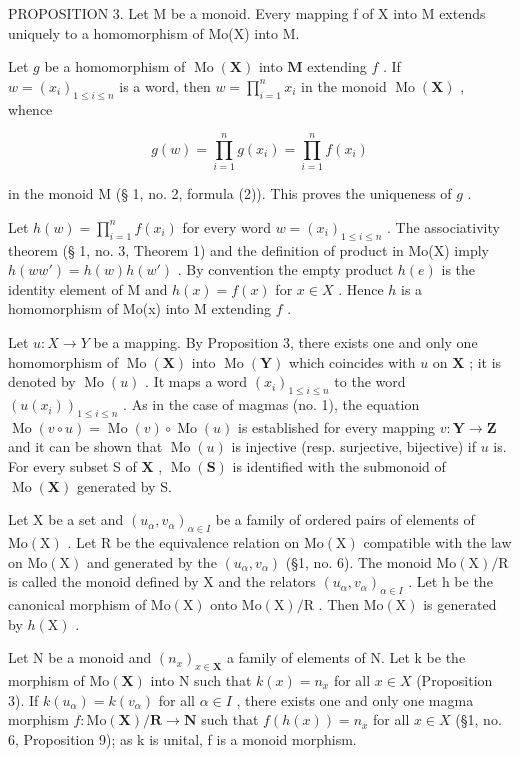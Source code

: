 PROPOSITION 3. Let M be a monoid. Every mapping f of X into M extends uniquely to a homomorphism of Mo(X) into M.

Let \(g\) be a homomorphism of \(\operatorname{Mo}(\mathbf{X})\) into \(\mathbf{M}\) extending \(f\) . If \(w = (x_{i})_{1 \leqslant i \leqslant n}\) is a word, then \(w = \prod_{i=1}^{n} x_{i}\) in the monoid \(\operatorname{Mo}(\mathbf{X})\) , whence

\[
g (w) = \prod_ {i = 1} ^ {n} g (x _ {i}) = \prod_ {i = 1} ^ {n} f (x _ {i})
\]

in the monoid M (§ 1, no. 2, formula (2)). This proves the uniqueness of \(g\) .

Let \(h(w) = \prod_{i=1}^{n} f(x_i)\) for every word \(w = (x_i)_{1 \leqslant i \leqslant n}\) . The associativity theorem (§ 1, no. 3, Theorem 1) and the definition of product in Mo(X) imply \(h(ww') = h(w)h(w')\) . By convention the empty product \(h(e)\) is the identity element of M and \(h(x) = f(x)\) for \(x \in X\) . Hence \(h\) is a homomorphism of Mo(x) into M extending \(f\) .

Let \(u: X \to Y\) be a mapping. By Proposition 3, there exists one and only one homomorphism of \(\operatorname{Mo}(\mathbf{X})\) into \(\operatorname{Mo}(\mathbf{Y})\) which coincides with \(u\) on \(\mathbf{X}\) ; it is denoted by \(\operatorname{Mo}(u)\) . It maps a word \((x_i)_{1 \leqslant i \leqslant n}\) to the word \((u(x_i))_{1 \leqslant i \leqslant n}\) . As in the case of magmas (no. 1), the equation \(\operatorname{Mo}(v \circ u) = \operatorname{Mo}(v) \circ \operatorname{Mo}(u)\) is established for every mapping \(v: \mathbf{Y} \to \mathbf{Z}\) and it can be shown that \(\operatorname{Mo}(u)\) is injective (resp. surjective, bijective) if \(u\) is. For every subset S of \(\mathbf{X}\) , \(\operatorname{Mo}(\mathbf{S})\) is identified with the submonoid of \(\operatorname{Mo}(\mathbf{X})\) generated by S.

Let X be a set and \((u_{\alpha}, v_{\alpha})_{\alpha \in I}\) be a family of ordered pairs of elements of \(\mathrm{Mo}(\mathrm{X})\) . Let R be the equivalence relation on \(\mathrm{Mo}(\mathrm{X})\) compatible with the law on \(\mathrm{Mo}(\mathrm{X})\) and generated by the \((u_{\alpha}, v_{\alpha})\) (§1, no. 6). The monoid \(\mathrm{Mo}(\mathrm{X})/\mathrm{R}\) is called the monoid defined by X and the relators \((u_{\alpha}, v_{\alpha})_{\alpha \in I}\) . Let h be the canonical morphism of \(\mathrm{Mo}(\mathrm{X})\) onto \(\mathrm{Mo}(\mathrm{X})/\mathrm{R}\) . Then \(\mathrm{Mo}(\mathrm{X})\) is generated by \(h(\mathrm{X})\) .

Let N be a monoid and \((n_{x})_{x\in\mathbf{X}}\) a family of elements of N. Let k be the morphism of \(\mathrm{Mo}(\mathbf{X})\) into N such that \(k(x)=n_{x}\) for all \(x\in X\) (Proposition 3). If \(k(u_{\alpha})=k(v_{\alpha})\) for all \(\alpha\in I\) , there exists one and only one magma morphism \(f:\mathrm{Mo}(\mathbf{X})/\mathbf{R}\to\mathbf{N}\) such that \(f(h(x))=n_{x}\) for all \(x\in X\) (§1, no. 6, Proposition 9); as k is unital, f is a monoid morphism.
\relax{}
